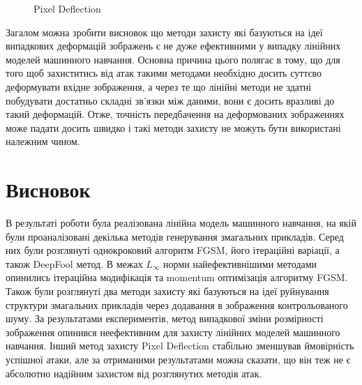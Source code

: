\documentclass[a4paper,14pt]{extreport}
\begin{document}
\begin{figure}[!htb]
		\endminipage\hfill
		\caption{Pixel Deflection}
		\label{fig:pixeldeflection}
	\end{figure}
	
	Загалом можна зробити висновок що методи захисту які базуються на ідеї випадкових деформацій зображень є не дуже ефективними у випадку лінійних моделей машинного навчання. Основна причина цього полягає в тому, що для того щоб захиститись від атак такими методами необхідно досить суттєво деформувати вхідне зображення, а через те що лінійні методи не здатні побудувати достатньо складні зв'язки між даними, вони є досить вразливі до такий деформацій. Отже, точність передбачення на деформованих зображеннях може падати досить швидко і такі методи захисту не можуть бути використані належним чином.

	\chapter{Висновок} 
	
	В результаті роботи була реалізована лінійна модель машинного навчання, на якій були проаналізовані декілька методів генерування змагальних прикладів. Серед них були розглянуті однокроковий алгоритм FGSM, його ітераційні варіації, а також DeepFool метод. В межах $L_{\infty}$ норми найефективнішими методами опинились ітераційна модифікація та momentum оптимізація алгоритму FGSM. Також були розглянуті два методи захисту які базуються на ідеї руйнування структури змагальних прикладів через додавання в зображення контрольованого шуму. За результатами експериментів, метод випадкової зміни розмірності зображення опинився неефективним для захисту лінійних моделей машинного навчання. Інший метод захисту Pixel Deflection стабільно зменшував ймовірність успішної атаки, але за отриманими результатами можна сказати, що він теж не є абсолютно надійним захистом від розглянутих методів атак.
	

	\nocite{goodfellow2014explaining}
	\nocite{kurakin2016adversarial}
	\nocite{moosavidezfooli2015deepfool}
	\nocite{dong2017boosting}
	\nocite{dong2019benchmarking}
	\nocite{yuan2017adversarial}
	\nocite{kurakin2018adversarial}
	\nocite{naseer2018local}
	\nocite{santhanam2018defending}
	\nocite{prakash2018deflecting}
	\printbibliography[title={Бібліографія}]
\end{document}
